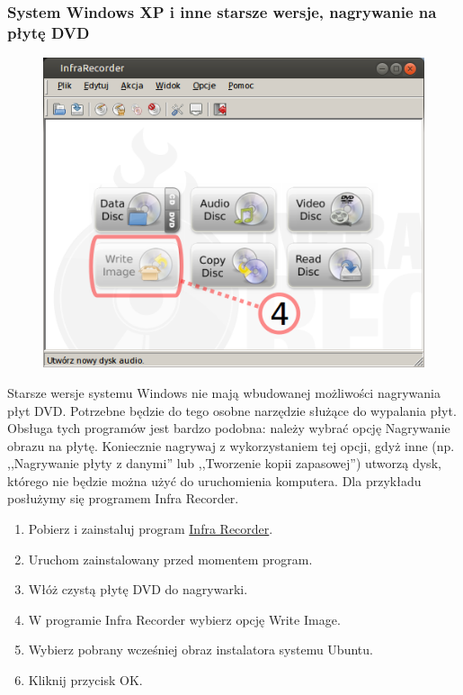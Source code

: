 \vspace{1cm}

\subsubsection{System Windows XP i inne starsze wersje, nagrywanie na płytę DVD}
\begin{figure}
	\vspace{-10pt}
	\includegraphics[width=\linewidth]{images/instalacja_nagrywanie_obrazu_DVD_winXP.png}
\end{figure}

Starsze wersje systemu Windows nie mają wbudowanej możliwości nagrywania płyt DVD. Potrzebne będzie do tego osobne narzędzie służące do wypalania płyt. Obsługa tych programów jest bardzo podobna: należy wybrać opcję \textcolor{ubuntu_orange}{Nagrywanie obrazu na płytę}. Koniecznie nagrywaj z wykorzystaniem tej opcji, gdyż inne (np. ,,Nagrywanie płyty z danymi'' lub ,,Tworzenie kopii zapasowej'') utworzą dysk, którego nie będzie można użyć do uruchomienia komputera. Dla przykładu posłużymy się programem Infra Recorder.

\begin{enumerate}[label=\protect\circled{\arabic*}]
\item Pobierz i zainstaluj program \href{http://infrarecorder.org/?page_id=5}{Infra Recorder}.
\item Uruchom zainstalowany przed momentem program.
\item Włóż czystą płytę DVD do nagrywarki.
\item W programie Infra Recorder wybierz opcję \textcolor{ubuntu_orange}{Write Image}.
\item Wybierz pobrany wcześniej obraz instalatora systemu Ubuntu.
\item Kliknij przycisk \textcolor{ubuntu_orange}{OK}.
\end{enumerate}
